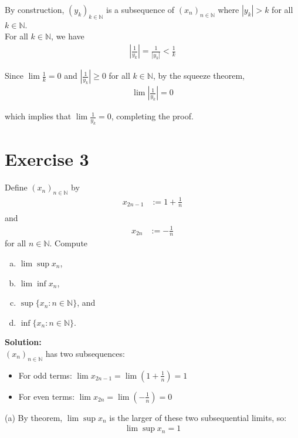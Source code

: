 \documentclass{article}
\begin{document}
By construction, $(y_k)_{k \in \mathbb{N}}$ is a subsequence of $(x_n)_{n \in \mathbb{N}}$ where $|y_k| > k$ for all $k \in \mathbb{N}$. \\

For all $k \in \mathbb{N}$, we have 
\begin{align*}
\left|\frac{1}{y_k}\right| = \frac{1}{|y_k|} < \frac{1}{k}
\end{align*}

Since $\lim \frac{1}{k} = 0$ and $\left|\frac{1}{y_k}\right| \geq 0$ for all $k \in \mathbb{N}$, by the squeeze theorem, 
\begin{align*}
\lim \left|\frac{1}{y_k}\right| = 0
\end{align*}

which implies that $\lim \frac{1}{y_k} = 0$, completing the proof.

\newpage

\section*{Exercise 3}
Define $(x_n)_{n \in \mathbb{N}}$ by
\begin{align*}
x_{2n-1} &:= 1+\frac{1}{n}\\
\end{align*}
and
\begin{align*}
x_{2n} &:= -\frac{1}{n}
\end{align*}
for all $n \in \mathbb{N}$. Compute
\begin{enumerate}[(a)]
\item $\lim \sup x_n$,
\item $\lim \inf x_n$,
\item $\sup\{x_n : n \in \mathbb{N}\}$, and
\item $\inf\{x_n : n \in \mathbb{N}\}$.
\end{enumerate}

\textbf{Solution: }\\

$(x_n)_{n \in \mathbb{N}}$ has two subsequences:
\begin{itemize}
    \item For odd terms: $\lim x_{2n-1} = \lim (1+\frac{1}{n}) = 1$
    \item For even terms: $\lim x_{2n} = \lim (-\frac{1}{n}) = 0$
\end{itemize}

(a) By theorem, $\lim \sup x_n$ is the larger of these two subsequential limits, so:
\begin{align*}
\lim \sup x_n = 1
\end{align*}
\end{document}
